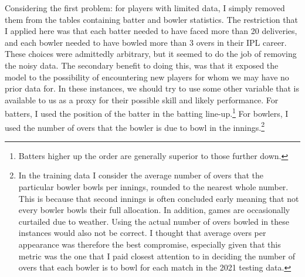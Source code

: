 Considering the first problem: for players with limited data, I simply removed them from the tables containing batter and bowler statistics. The restriction that I applied here was that each batter needed to have faced more than 20 deliveries, and each bowler needed to have bowled more than 3 overs in their IPL career. These choices were admittedly arbitrary, but it seemed to do the job of removing the noisy data. The secondary benefit to doing this, was that it exposed the model to the possibility of encountering new players for whom we may have no prior data for. In these instances, we should try to use some other variable that is available to us as a proxy for their possible skill and likely performance. For batters, I used the position of the batter in the batting line-up.\footnote{Batters higher up the order are generally superior to those further down.} For bowlers, I used the number of overs that the bowler is due to bowl in the innings.\footnote{In the training data I consider the average number of overs that the particular bowler bowls per innings, rounded to the nearest whole number. This is because that second innings is often concluded early meaning that not every bowler bowls their full allocation. In addition, games are occasionally curtailed due to weather. Using the actual number of overs bowled in these instances would also not be correct. I thought that average overs per appearance was therefore the best compromise, especially given that this metric was the one that I paid closest attention to in deciding the number of overs that each bowler is to bowl for each match in the 2021 testing data.}

